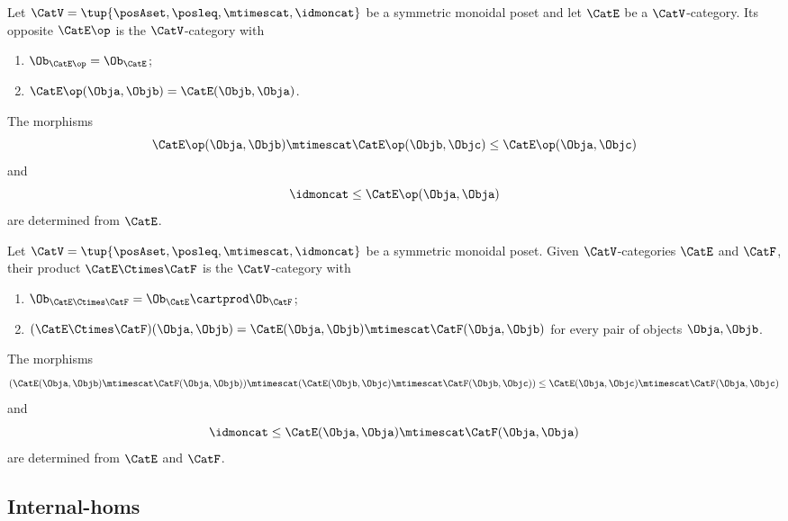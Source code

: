 \begin{ctdefinition}
    \label{def:monoidal-poset-cat-op}
    Let $\CatV = \tup{\posAset, \posleq, \mtimescat, \idmoncat}$ be a symmetric monoidal poset and let $\CatE$ be a $\CatV$-category.
    Its opposite $\CatE\op$ is the $\CatV$-category with
    \begin{enumerate}
        \item $\Ob_{\CatE\op} = \Ob_\CatE$;
        \item $\CatE\op(\Obja, \Objb) = \CatE(\Objb, \Obja)$.
    \end{enumerate}

    The morphisms
    \begin{equation}
        \CatE\op(\Obja, \Objb) \mtimescat \CatE\op(\Objb, \Objc) \leq \CatE\op(\Obja, \Objc)
    \end{equation}
    and
    \begin{equation}
        \idmoncat \leq \CatE\op(\Obja, \Obja)
    \end{equation}
    are determined from $\CatE$.
\end{ctdefinition}

\begin{ctdefinition}
    \label{def:monoidal-poset-cat-product}
    Let $\CatV = \tup{\posAset, \posleq, \mtimescat, \idmoncat}$ be a symmetric monoidal poset.
    Given $\CatV$-categories $\CatE$ and $\CatF$, their product $\CatE \Ctimes \CatF$ is the $\CatV$-category with
    \begin{enumerate}
        \item $\Ob_{\CatE \Ctimes \CatF} = \Ob_\CatE \cartprod \Ob_\CatF$;
        \item $(\CatE \Ctimes \CatF)(\Obja, \Objb) = \CatE (\Obja, \Objb) \mtimescat \CatF (\Obja, \Objb)$ for every pair of objects $\Obja, \Objb$.
    \end{enumerate}
    The morphisms
    \begin{equation}
        (\CatE(\Obja, \Objb) \mtimescat \CatF(\Obja, \Objb)) \mtimescat (\CatE(\Objb, \Objc) \mtimescat \CatF(\Objb, \Objc)) \leq \CatE(\Obja, \Objc) \mtimescat \CatF(\Obja, \Objc)
    \end{equation}
    and
    \begin{equation}
        \idmoncat \leq \CatE(\Obja, \Obja) \mtimescat \CatF(\Obja, \Obja)
    \end{equation}
    are determined from $\CatE$ and $\CatF$.
\end{ctdefinition}

\subsection{Internal-homs}

